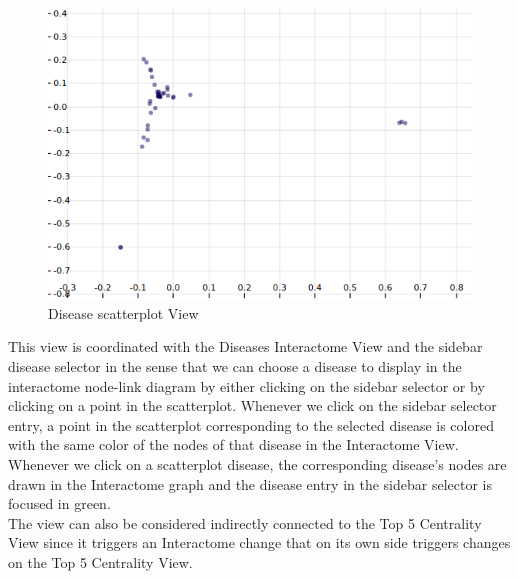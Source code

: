 \documentclass[12pt,twocolumn,twoside]{article}
\begin{document}
	\begin{figure}
		\includegraphics[width=.95\linewidth]{disease-scatterplot-mds.png}
		\caption{Disease scatterplot View}
		\label{scatter}
	\end{figure}
	This view is coordinated with the Diseases Interactome View and the sidebar disease selector in the sense that we can choose a disease to display in the interactome node-link diagram by either clicking on the sidebar selector or by clicking on a point in the scatterplot. Whenever we click on the sidebar selector entry, a point in the scatterplot corresponding to the selected disease is colored with the same color of the nodes of that disease in the Interactome View. Whenever we click on a scatterplot disease, the corresponding disease's nodes are drawn in the Interactome graph and the disease entry in the sidebar selector is focused in green.\\ The view can also be considered indirectly connected to the Top 5 Centrality View since it triggers an Interactome change that on its own side triggers changes on the Top 5 Centrality View. \\ 
	
\end{document}
